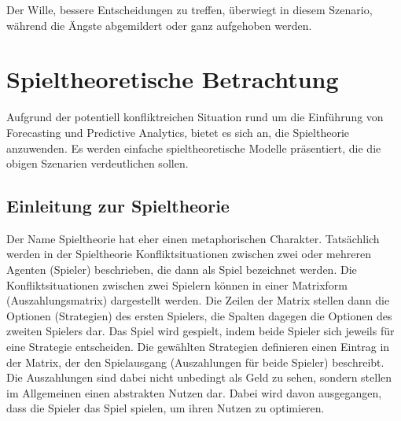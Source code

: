 
Der Wille, bessere Entscheidungen zu treffen, überwiegt in diesem Szenario, während
die Ängste abgemildert oder ganz aufgehoben werden.

\section{Spieltheoretische Betrachtung}


Aufgrund der potentiell konfliktreichen Situation rund um die Einführung von
Forecasting und Predictive Analytics, bietet es sich an, die
Spieltheorie anzuwenden. Es werden einfache spieltheoretische Modelle
präsentiert, die die obigen Szenarien verdeutlichen sollen.

\subsection{Einleitung zur Spieltheorie}

Der Name Spieltheorie hat eher einen metaphorischen Charakter. Tatsächlich
werden in der Spieltheorie Konfliktsituationen zwischen zwei oder mehreren Agenten (Spieler) beschrieben,
die dann als Spiel bezeichnet werden. Die Konfliktsituationen zwischen zwei Spielern können in einer Matrixform (Auszahlungsmatrix)
dargestellt werden. Die Zeilen der Matrix stellen dann die Optionen (Strategien) des ersten Spielers, die Spalten dagegen die
Optionen des zweiten Spielers dar. Das Spiel wird gespielt, indem beide Spieler sich jeweils für eine Strategie entscheiden. 
Die gewählten Strategien definieren einen Eintrag in der Matrix, der den Spielausgang (Auszahlungen für beide Spieler) beschreibt.
Die Auszahlungen sind dabei nicht unbedingt als Geld zu sehen, sondern stellen im Allgemeinen einen abstrakten Nutzen dar. Dabei
wird davon ausgegangen, dass die Spieler das Spiel spielen, um ihren Nutzen zu optimieren.


